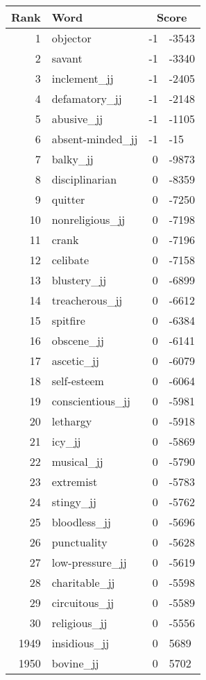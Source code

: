 \begin{longtable}[!htbp]{| rlr@{.}l |}
    \hline
    \textbf{Rank} & \textbf{Word} & \multicolumn{2}{c|}{\textbf{Score}} \\
    \hline
    \endhead
    1 & objector & -1 & -3543 \\
    2 & savant & -1 & -3340 \\
    3 & inclement\_jj & -1 & -2405 \\
    4 & defamatory\_jj & -1 & -2148 \\
    5 & abusive\_jj & -1 & -1105 \\
    6 & absent-minded\_jj & -1 & -15 \\
    7 & balky\_jj & 0 & -9873 \\
    8 & disciplinarian & 0 & -8359 \\
    9 & quitter & 0 & -7250 \\
    10 & nonreligious\_jj & 0 & -7198 \\
    11 & crank & 0 & -7196 \\
    12 & celibate & 0 & -7158 \\
    13 & blustery\_jj & 0 & -6899 \\
    14 & treacherous\_jj & 0 & -6612 \\
    15 & spitfire & 0 & -6384 \\
    16 & obscene\_jj & 0 & -6141 \\
    17 & ascetic\_jj & 0 & -6079 \\
    18 & self-esteem & 0 & -6064 \\
    19 & conscientious\_jj & 0 & -5981 \\
    20 & lethargy & 0 & -5918 \\
    21 & icy\_jj & 0 & -5869 \\
    22 & musical\_jj & 0 & -5790 \\
    23 & extremist & 0 & -5783 \\
    24 & stingy\_jj & 0 & -5762 \\
    25 & bloodless\_jj & 0 & -5696 \\
    26 & punctuality & 0 & -5628 \\
    27 & low-pressure\_jj & 0 & -5619 \\
    28 & charitable\_jj & 0 & -5598 \\
    29 & circuitous\_jj & 0 & -5589 \\
    30 & religious\_jj & 0 & -5556 \\
    1949 & insidious\_jj & 0 & 5689 \\
    1950 & bovine\_jj & 0 & 5702 \\

\end{longtable}
